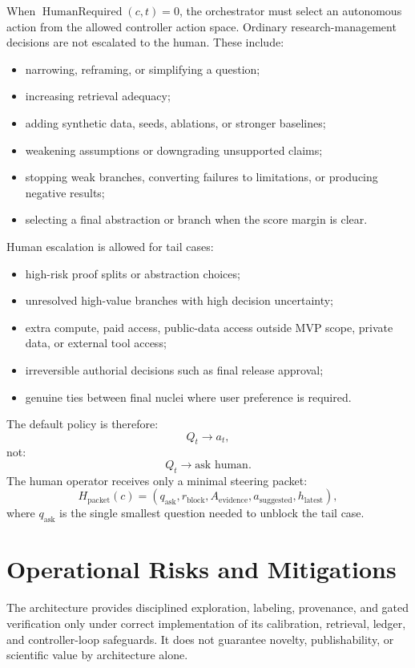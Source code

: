 \documentclass[11pt]{article}
\begin{document}
When $\operatorname{HumanRequired}(c,t)=0$, the orchestrator must select an autonomous action from the allowed controller action space. Ordinary research-management decisions are not escalated to the human. These include:
\begin{itemize}[leftmargin=*]
    \item narrowing, reframing, or simplifying a question;
    \item increasing retrieval adequacy;
    \item adding synthetic data, seeds, ablations, or stronger baselines;
    \item weakening assumptions or downgrading unsupported claims;
    \item stopping weak branches, converting failures to limitations, or producing negative results;
    \item selecting a final abstraction or branch when the score margin is clear.
\end{itemize}

Human escalation is allowed for tail cases:
\begin{itemize}[leftmargin=*]
    \item high-risk proof splits or abstraction choices;
    \item unresolved high-value branches with high decision uncertainty;
    \item extra compute, paid access, public-data access outside MVP scope, private data, or external tool access;
    \item irreversible authorial decisions such as final release approval;
    \item genuine ties between final nuclei where user preference is required.
\end{itemize}

The default policy is therefore:
$$
Q_t \longrightarrow a_t,
$$
not:
$$
Q_t \longrightarrow \text{ask human}.
$$
The human operator receives only a minimal steering packet:
$$
H_{\text{packet}}(c)=(q_{\text{ask}},r_{\text{block}},A_{\text{evidence}},a_{\text{suggested}},h_{\text{latest}}),
$$
where $q_{\text{ask}}$ is the single smallest question needed to unblock the tail case.

\section{Operational Risks and Mitigations}

The architecture provides disciplined exploration, labeling, provenance, and gated verification only under correct implementation of its calibration, retrieval, ledger, and controller-loop safeguards. It does not guarantee novelty, publishability, or scientific value by architecture alone.
\end{document}
